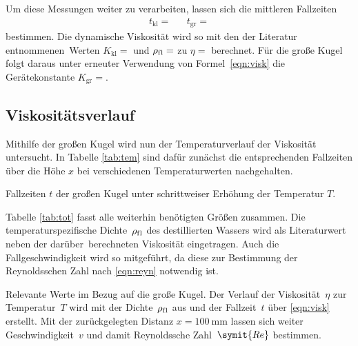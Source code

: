 Um diese Messungen weiter zu verarbeiten, lassen sich die mittleren Fallzeiten
\begin{align*}
	t_\text{kl} =  && t_\text{gr} = 
\end{align*}
bestimmen. Die dynamische Viskosität wird so mit den der Literatur entnommenen~Werten
$K_\text{kl} = $ \cite{viskos} und
$\rho_\text{f\hspace{0.15ex}l} = $ \cite{kohl_prak_1_dens} zu
$\eta = $ berechnet. Für die große Kugel folgt daraus unter erneuter Verwendung
von Formel~\eqref{eqn:visk} die Gerätekonstante $K_\text{gr} = $.

\subsection{Viskositätsverlauf}

Mithilfe der großen Kugel wird nun der Temperaturverlauf der Viskosität untersucht. In Tabelle \ref{tab:tem} sind
dafür zunächst die entsprechenden Fallzeiten über die Höhe $x$ bei verschiedenen Temperaturwerten nachgehalten.

\begin{table}
	\centering
	\captionsetup{width=0.95\linewidth}
	\caption{Fallzeiten $t$ der großen Kugel unter schrittweiser Erhöhung der Temperatur $T$.}
	
	\label{tab:tem}
\end{table}

Tabelle \ref{tab:tot} fasst alle weiterhin benötigten Größen zusammen. Die temperaturspezifische
Dichte~$\rho_\text{f\hspace{0.15ex}l}$ des destillierten Wassers wird als Literaturwert neben der \mbox{darüber
berechneten} Viskosität eingetragen. Auch die Fallgeschwindigkeit wird so mitgeführt, da diese zur Bestimmung
der Reynoldsschen Zahl nach \eqref{eqn:reyn} notwendig ist.

\begin{table}
	\centering
	\captionsetup{width=0.95\linewidth}
	\caption{Relevante Werte im Bezug auf die große Kugel. Der Verlauf der Viskosität~$\eta$ zur Temperatur~$T$
			 wird mit der Dichte~$\rho_\text{f\hspace{0.15ex}l}$ aus \cite{kohl_prak_1_dens} und der Fallzeit~$t$ über
			 \eqref{eqn:visk} erstellt. Mit der zurückgelegten Distanz $x = \qty{100}{\milli\meter}$ lassen sich
			 weiter Geschwindigkeit~$v$ und damit Reynoldssche Zahl~$\symit{Re}$ bestimmen.}
	
	\label{tab:tot}
\end{table}

